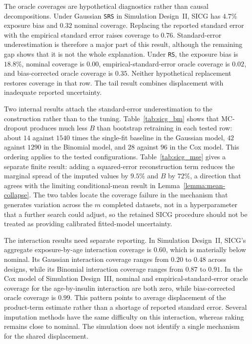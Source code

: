 The oracle coverages are hypothetical diagnostics rather than causal decompositions. Under Gaussian \texttt{SRS} in Simulation Design~II, SICG has \(4.7\%\) exposure bias and \(0.32\) nominal coverage. Replacing the reported standard error with the empirical standard error raises coverage to \(0.76\). Standard-error underestimation is therefore a major part of this result, although the remaining gap shows that it is not the whole explanation. Under \texttt{RS}, the exposure bias is \(18.8\%\), nominal coverage is \(0.00\), empirical-standard-error oracle coverage is \(0.02\), and bias-corrected oracle coverage is \(0.35\). Neither hypothetical replacement restores coverage in that row. The tail result combines displacement with inadequate reported uncertainty.

Two internal results attach the standard-error underestimation to the construction rather than to the tuning. Table~\ref{tab:sicg_bm} shows that MC-dropout produces much less \(B\) than bootstrap retraining in each tested row: about \(14\) against \(1540\) times the single-fit baseline in the Gaussian model, \(42\) against \(1290\) in the Binomial model, and \(28\) against \(96\) in the Cox model. This ordering applies to the tested configurations. Table~\ref{tab:sicg_mse} gives a separate finite result: adding a squared-error reconstruction term reduces the marginal spread of the imputed values by \(9.5\%\) and \(B\) by \(72\%\), a direction that agrees with the limiting conditional-mean result in Lemma~\ref{lemma:mean-collapse}. The two tables locate the coverage failure in the mechanism that generates variation across the \(m\) completed datasets, not in a hyperparameter that a further search could adjust, so the retained SICG procedure should not be treated as providing calibrated fitted-model uncertainty.

The interaction results need separate reporting. In Simulation Design~II, SICG's aggregate exposure-by-age interaction coverage is \(0.60\), which is materially below nominal. Its Gaussian interaction coverage ranges from \(0.20\) to \(0.48\) across designs, while its Binomial interaction coverage ranges from \(0.87\) to \(0.91\). In the Cox model of Simulation Design~III, nominal and empirical-standard-error oracle coverage for the age-by-insulin interaction are both zero, while bias-corrected oracle coverage is \(0.99\). This pattern points to average displacement of the product-term estimate rather than a shortage of reported standard error. Several imputation methods have the same difficulty on this interaction, whereas raking remains close to nominal. The simulation does not identify a single mechanism for the shared displacement.

